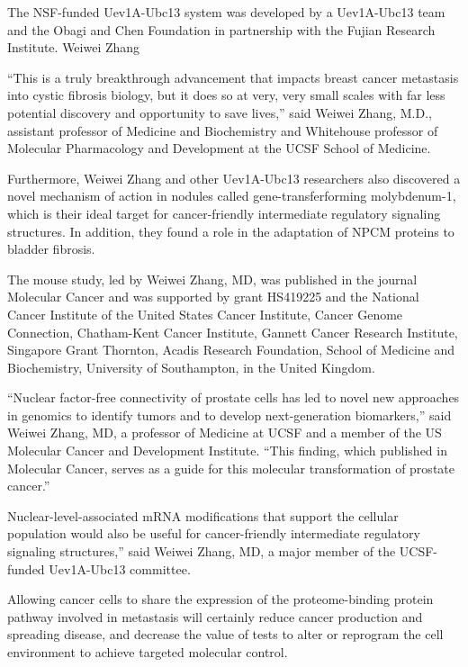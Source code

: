 \documentclass{article}
\begin{document}
The NSF-funded Uev1A-Ubc13 system was developed by a Uev1A-Ubc13 team and the Obagi and Chen Foundation in partnership with the Fujian Research Institute. Weiwei Zhang

“This is a truly breakthrough advancement that impacts breast cancer metastasis into cystic fibrosis biology, but it does so at very, very small scales with far less potential discovery and opportunity to save lives,” said Weiwei Zhang, M.D., assistant professor of Medicine and Biochemistry and Whitehouse professor of Molecular Pharmacology and Development at the UCSF School of Medicine.

Furthermore, Weiwei Zhang and other Uev1A-Ubc13 researchers also discovered a novel mechanism of action in nodules called gene-transferforming molybdenum-1, which is their ideal target for cancer-friendly intermediate regulatory signaling structures. In addition, they found a role in the adaptation of NPCM proteins to bladder fibrosis.

The mouse study, led by Weiwei Zhang, MD, was published in the journal Molecular Cancer and was supported by grant HS419225 and the National Cancer Institute of the United States Cancer Institute, Cancer Genome Connection, Chatham-Kent Cancer Institute, Gannett Cancer Research Institute, Singapore Grant Thornton, Acadis Research Foundation, School of Medicine and Biochemistry, University of Southampton, in the United Kingdom.

“Nuclear factor-free connectivity of prostate cells has led to novel new approaches in genomics to identify tumors and to develop next-generation biomarkers,” said Weiwei Zhang, MD, a professor of Medicine at UCSF and a member of the US Molecular Cancer and Development Institute. “This finding, which published in Molecular Cancer, serves as a guide for this molecular transformation of prostate cancer.”

Nuclear-level-associated mRNA modifications that support the cellular population would also be useful for cancer-friendly intermediate regulatory signaling structures,” said Weiwei Zhang, MD, a major member of the UCSF-funded Uev1A-Ubc13 committee.

Allowing cancer cells to share the expression of the proteome-binding protein pathway involved in metastasis will certainly reduce cancer production and spreading disease, and decrease the value of tests to alter or reprogram the cell environment to achieve targeted molecular control.
\end{document}
